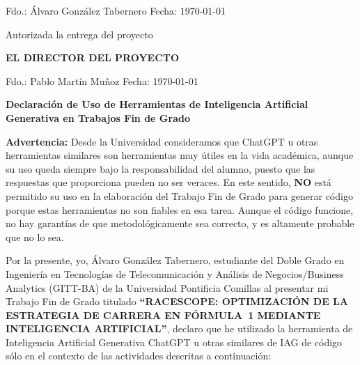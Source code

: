 \documentclass[12pt, a4paper]{book}
\begin{document}
\vspace{2cm}

\noindent Fdo.: Álvaro González Tabernero \hfill Fecha: \today

\vspace{2cm}

\begin{center}
Autorizada la entrega del proyecto

\vspace{1em}
\textbf{EL DIRECTOR DEL PROYECTO}
\end{center}

\vspace{1em}
\noindent Fdo.: Pablo Martín Muñoz \hfill Fecha: \today

\cleardoublepage
\thispagestyle{empty}
\begingroup
\small
\setlength{\parskip}{4pt plus 1pt minus 1pt}

\begin{center}
\textbf{Declaración de Uso de Herramientas de Inteligencia Artificial Generativa en Trabajos Fin de Grado}
\end{center}

\noindent
\textbf{Advertencia:} Desde la Universidad consideramos que ChatGPT u otras herramientas similares son herramientas muy útiles en la vida académica, aunque su uso queda siempre bajo la responsabilidad del alumno, puesto que las respuestas que proporciona pueden no ser veraces. En este sentido, \textbf{NO} está permitido su uso en la elaboración del Trabajo Fin de Grado para generar código porque estas herramientas no son fiables en esa tarea. Aunque el código funcione, no hay garantías de que metodológicamente sea correcto, y es altamente probable que no lo sea.

\noindent
Por la presente, yo, Álvaro González Tabernero, estudiante del Doble Grado en Ingeniería en Tecnologías de Telecomunicación y Análisis de Negocios/Business Analytics (GITT-BA) de la Universidad Pontificia Comillas al presentar mi Trabajo Fin de Grado titulado \textbf{``RACESCOPE: OPTIMIZACIÓN DE LA ESTRATEGIA DE CARRERA EN FÓRMULA~1 MEDIANTE INTELIGENCIA ARTIFICIAL''}, declaro que he utilizado la herramienta de Inteligencia Artificial Generativa ChatGPT u otras similares de IAG de código sólo en el contexto de las actividades descritas a continuación:
\end{document}
